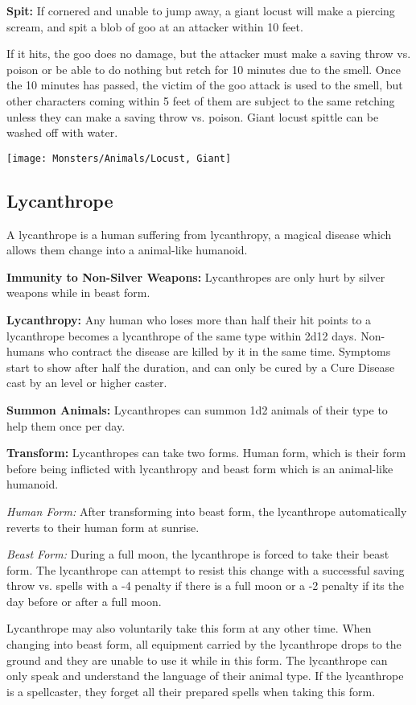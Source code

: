 \begin{multicols*}{2}
\textbf{Spit:} If cornered and unable to jump away, a giant locust will make a piercing scream, and spit a blob of goo at an attacker within 10 feet.

If it hits, the goo does no damage, but the attacker must make a saving throw vs. poison or be able to do nothing but retch for 10 minutes due to the smell. Once the 10 minutes has passed, the victim of the goo attack is used to the smell, but other characters coming within 5 feet of them are subject to the same retching unless they can make a saving throw vs. poison. Giant locust spittle can be washed off with water.

\texttt{[image: Monsters/Animals/Locust, Giant]}

\subsection{Lycanthrope}
A lycanthrope is a human suffering from lycanthropy, a magical disease which allows them change into a animal-like humanoid.

\textbf{Immunity to Non-Silver Weapons:} Lycanthropes are only hurt by silver weapons while in beast form.

\textbf{Lycanthropy:} Any human who loses more than half their hit points to a lycanthrope becomes a lycanthrope of the same type within 2d12 days. Non-humans who contract the disease are killed by it in the same time. Symptoms start to show after half the duration, and can only be cured by a Cure Disease cast by an  level or higher caster.

\textbf{Summon Animals:} Lycanthropes can summon 1d2 animals of their type to help them once per day.

\textbf{Transform:} Lycanthropes can take two forms. Human form, which is their form before being inflicted with lycanthropy and beast form which is an animal-like humanoid.

\textit{Human Form:} After transforming into beast form, the lycanthrope automatically reverts to their human form at sunrise.

\textit{Beast Form:} During a full moon, the lycanthrope is forced to take their beast form. The lycanthrope can attempt to resist this change with a successful saving throw vs. spells with a -4 penalty if there is a full moon or a -2 penalty if its the day before or after a full moon.

Lycanthrope may also voluntarily take this form at any other time. When changing into beast form, all equipment carried by the lycanthrope drops to the ground and they are unable to use it while in this form. The lycanthrope can only speak and understand the language of their animal type. If the lycanthrope is a spellcaster, they forget all their prepared spells when taking this form.


\end{multicols*}
